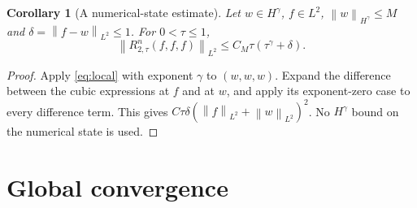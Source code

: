 \documentclass[11pt]{article}
\newtheorem{corollary}[theorem]{Corollary}
\theoremstyle{remark}\newtheorem{remark}[theorem]{Remark}
\newcommand{\norm}[2][]{\left\lVert #2\right\rVert_{#1}}
\begin{document}
\begin{corollary}[A numerical-state estimate]\label{cor:numerical}
Let $w\in H^\gamma$, $f\in L^2$, $\norm[H^\gamma]{w}\leq M$ and
$\delta=\norm[L^2]{f-w}\leq1$. For $0<\tau\leq1$,
\begin{equation}\label{eq:numerical}
\norm[L^2]{R_{2,\tau}^{n}(f,f,f)}\leq C_M\tau(\tau^\gamma+\delta).
\end{equation}
\end{corollary}
\begin{proof}
Apply \eqref{eq:local} with exponent $\gamma$ to $(w,w,w)$.
Expand the difference between the cubic expressions at $f$ and at $w$,
and apply its exponent-zero case to every difference term. This gives
$C\tau\delta(\norm[L^2]{f}+\norm[L^2]{w})^2$.
No $H^\gamma$ bound on the numerical state is used.
\end{proof}

\section{Global convergence}\label{sec:convergence}
\end{document}
